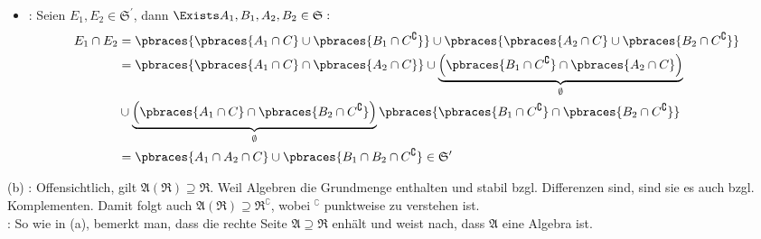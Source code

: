 \begin{solution}
\begin{itemize}
\begin{itemize}
    \item {}: Seien $E_1, E_2 \in \mathfrak{S}^\prime$, dann $\Exists A_1, B_1, A_2, B_2 \in \mathfrak{S}:$
    \begin{align*}
      E_1 \cap E_2
      & = \pbraces{\pbraces{A_1 \cap C} \cup \pbraces{B_1 \cap C^\complement}} \cup
        \pbraces{\pbraces{A_2 \cap C} \cup \pbraces{B_2 \cap C^\complement}} \\
      & = \pbraces{\pbraces{A_1 \cap C} \cap \pbraces{A_2 \cap C}} \cup
          \underbrace
          {
            \Big (
            \pbraces{B_1 \cap C^\complement} \cap \pbraces{A_2 \cap C}
            \Big )
          }_\emptyset \\
      & \cup \underbrace
          {
            \Big (
            \pbraces{A_1 \cap C} \cap \pbraces{B_2 \cap C^\complement}
            \Big )
            }_\emptyset
            \pbraces
          {
            \pbraces{B_1 \cap C^\complement} \cap
            \pbraces{B_2 \cap C^\complement}
          } \\
      & = \pbraces{A_1 \cap A_2 \cap C} \cup
          \pbraces{B_1 \cap B_2 \cap C^\complement}
          \in \mathfrak{S}^\prime
    \end{align*}

  \end{itemize}

\end{itemize}

(b) \Quote{$\supseteq$}: Offensichtlich, gilt $\mathfrak{A}(\mathfrak{R}) \supseteq \mathfrak{R}$. Weil Algebren die Grundmenge enthalten und stabil bzgl. Differenzen sind, sind sie es auch bzgl. Komplementen. Damit folgt auch $\mathfrak{A}(\mathfrak{R}) \supseteq \mathfrak{R}^\complement$, wobei $^\complement$ punktweise zu verstehen ist. \\

\Quote{$\subseteq$}: So wie in (a), bemerkt man, dass die rechte Seite $\mathfrak{A} \supseteq \mathfrak{R}$ enhält und weist nach, dass $\mathfrak{A}$ eine Algebra ist.

\end{solution}
